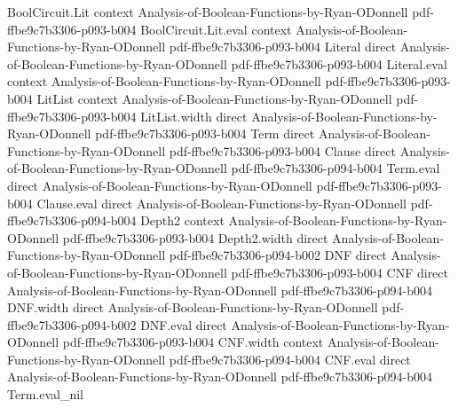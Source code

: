 \begin{lemma}
\leanok
{}
\proofstep
  {BoolCircuit.Lit}
  {context}
  {Analysis-of-Boolean-Functions-by-Ryan-ODonnell}
  {pdf-ffbe9c7b3306-p093-b004}
\proofstep
  {BoolCircuit.Lit.eval}
  {context}
  {Analysis-of-Boolean-Functions-by-Ryan-ODonnell}
  {pdf-ffbe9c7b3306-p093-b004}
\proofstep
  {Literal}
  {direct}
  {Analysis-of-Boolean-Functions-by-Ryan-ODonnell}
  {pdf-ffbe9c7b3306-p093-b004}
\proofstep
  {Literal.eval}
  {context}
  {Analysis-of-Boolean-Functions-by-Ryan-ODonnell}
  {pdf-ffbe9c7b3306-p093-b004}
\proofstep
  {LitList}
  {context}
  {Analysis-of-Boolean-Functions-by-Ryan-ODonnell}
  {pdf-ffbe9c7b3306-p093-b004}
\proofstep
  {LitList.width}
  {direct}
  {Analysis-of-Boolean-Functions-by-Ryan-ODonnell}
  {pdf-ffbe9c7b3306-p093-b004}
\proofstep
  {Term}
  {direct}
  {Analysis-of-Boolean-Functions-by-Ryan-ODonnell}
  {pdf-ffbe9c7b3306-p093-b004}
\proofstep
  {Clause}
  {direct}
  {Analysis-of-Boolean-Functions-by-Ryan-ODonnell}
  {pdf-ffbe9c7b3306-p094-b004}
\proofstep
  {Term.eval}
  {direct}
  {Analysis-of-Boolean-Functions-by-Ryan-ODonnell}
  {pdf-ffbe9c7b3306-p093-b004}
\proofstep
  {Clause.eval}
  {direct}
  {Analysis-of-Boolean-Functions-by-Ryan-ODonnell}
  {pdf-ffbe9c7b3306-p094-b004}
\proofstep
  {Depth2}
  {context}
  {Analysis-of-Boolean-Functions-by-Ryan-ODonnell}
  {pdf-ffbe9c7b3306-p093-b004}
\proofstep
  {Depth2.width}
  {direct}
  {Analysis-of-Boolean-Functions-by-Ryan-ODonnell}
  {pdf-ffbe9c7b3306-p094-b002}
\proofstep
  {DNF}
  {direct}
  {Analysis-of-Boolean-Functions-by-Ryan-ODonnell}
  {pdf-ffbe9c7b3306-p093-b004}
\proofstep
  {CNF}
  {direct}
  {Analysis-of-Boolean-Functions-by-Ryan-ODonnell}
  {pdf-ffbe9c7b3306-p094-b004}
\proofstep
  {DNF.width}
  {direct}
  {Analysis-of-Boolean-Functions-by-Ryan-ODonnell}
  {pdf-ffbe9c7b3306-p094-b002}
\proofstep
  {DNF.eval}
  {direct}
  {Analysis-of-Boolean-Functions-by-Ryan-ODonnell}
  {pdf-ffbe9c7b3306-p093-b004}
\proofstep
  {CNF.width}
  {context}
  {Analysis-of-Boolean-Functions-by-Ryan-ODonnell}
  {pdf-ffbe9c7b3306-p094-b004}
\proofstep
  {CNF.eval}
  {direct}
  {Analysis-of-Boolean-Functions-by-Ryan-ODonnell}
  {pdf-ffbe9c7b3306-p094-b004}
\proofstep
  {Term.eval_nil}

\end{lemma}
